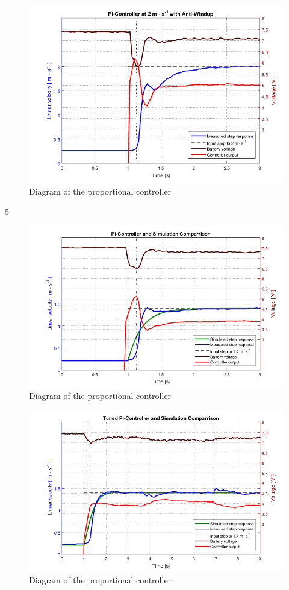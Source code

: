 %
\begin{figure}[H]
 	\centering
 	\includegraphics[width=\textwidth]{figures/PIwidthAntiWindup}
 	\caption{Diagram of the proportional controller}
 	\label{fig:PIwidthAntiWindup}
\end{figure}
%
5
%
\begin{figure}[H]
 	\centering
 	\includegraphics[width=\textwidth]{figures/CalculatedPI}
 	\caption{Diagram of the proportional controller}
 	\label{fig:CalculatedPI}
\end{figure}
%

%
\begin{figure}[H]
 	\centering
 	\includegraphics[width=\textwidth]{figures/TunedPI}
 	\caption{Diagram of the proportional controller}
 	\label{fig:TunedPI}
\end{figure}
%